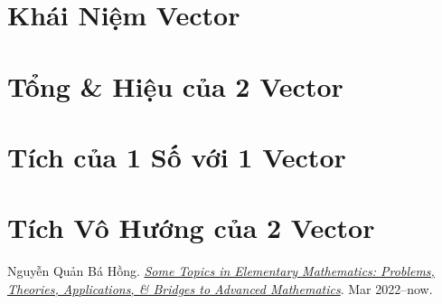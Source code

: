 \documentclass[oneside]{book}
\numberwithin{equation}{section}
\begin{document}
\section{Khái Niệm Vector}

\section{Tổng \& Hiệu của 2 Vector}

\section{Tích của 1 Số với 1 Vector}

\section{Tích Vô Hướng của 2 Vector}


\begin{thebibliography}{99}
	 Nguyễn Quản Bá Hồng. \href{https://github.com/NQBH/hobby/blob/master/elementary_mathematics/some_topics_in_elementary_mathematics_problems_theories_applications_bridges_to_advanced_mathematics/NQBH_some_topics_in_elementary_mathematics_problems_theories_applications_bridges_to_advanced_mathematics.pdf}{\textit{Some Topics in Elementary Mathematics: Problems, Theories, Applications, \& Bridges to Advanced Mathematics}}. Mar 2022--now.
\end{thebibliography}


\printbibliography[heading=bibintoc]
\end{document}

